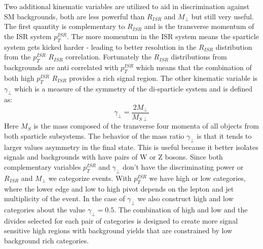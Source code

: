 Two additional kinematic variables are utilized to aid in discrimination against SM backgrounds, both are less powerful than $R_{ISR}$ and $M_\perp$ but still very useful. The first quantity is complementary to $R_{ISR}$ and is the transverse momentum of the ISR system $p_T^{ISR}$. The more momentum in the ISR system means the sparticle system gets kicked harder - leading to better resolution in the $R_{ISR}$ distribution from the $p_T^{ISR}$ $R_{ISR}$ correlation. Fortunately the $R_{ISR}$  distributions from backgrounds are anti correlated with $p_T^{ISR}$ which means that the combination of both high  $p_T^{ISR}$ $R_{ISR}$ provides a rich signal region. The other kinematic variable is $\gamma_\perp$ which is a measure of the symmetry of the di-sparticle system and is defined as:
\begin{equation}
\gamma_\perp = \frac{2M_\perp}{M_{S\perp}}
\end{equation}
Here $M_S$ is the mass composed of the transverse four momenta of all objects from  both sparticle subsystems. The behavior of the mass ratio $\gamma_\perp$ is that it tends to larger values asymmetry in the final state. This is useful because it better isolates signals and backgrounds with have pairs of W or Z bosons. Since both complementary variables $p_T^{ISR}$ and $\gamma_\perp$ don't have the discriminating power or $R_{ISR}$ and $M_\perp$ we categorize events. With $p_T^{ISR}$ we have high or low categories, where the lower edge and low to high pivot depends on the lepton and jet multiplicity of the event. In the case of $\gamma_\perp$ we also construct high and low categories about the value $\gamma_\perp= 0.5$. The combination of high and low and the divides selected for each pair of categories is designed to create more signal sensitive high regions with background yields that are constrained by low background rich categories.

  


